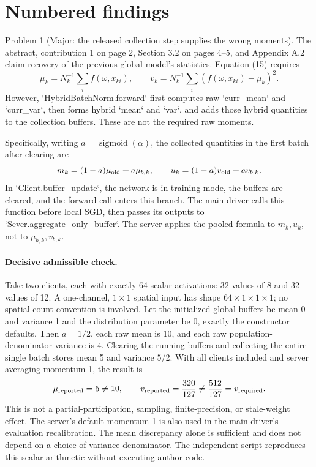 \documentclass[10pt]{article}
\begin{document}
\section*{Numbered findings}
Problem 1 (Major: the released collection step supplies the wrong moments).  The abstract, contribution 1 on page 2, Section 3.2 on pages 4–5, and Appendix A.2 claim recovery of the previous global model’s statistics. Equation (15) requires \[\mu_k=N_k^{-1}\sum_i f(\omega,x_{ki}),\qquad
 v_k=N_k^{-1}\sum_i(f(\omega,x_{ki})-\mu_k)^2 .\] However, `HybridBatchNorm.forward` first computes raw `curr\_mean` and `curr\_var`, then forms hybrid `mean` and `var`, and adds those hybrid quantities to the collection buffers. These are not the required raw moments.\par
Specifically, writing \(a=\operatorname{sigmoid}(\alpha)\), the collected quantities in the first batch after clearing are \[m_k=(1-a)\mu_{\rm old}+a\mu_{b,k},\qquad
 u_k=(1-a)v_{\rm old}+av_{b,k}.\] In `Client.buffer\_update`, the network is in training mode, the buffers are cleared, and the forward call enters this branch. The main driver calls this function before local SGD, then passes its outputs to `Sever.aggregate\_only\_buffer`. The server applies the pooled formula to \(m_k,u_k\), not to \(\mu_{b,k},v_{b,k}\).\par
\paragraph*{Decisive admissible check.}\mbox{}\par
Take two clients, each with exactly 64 scalar activations: 32 values of 8 and 32 values of 12. A one-channel, \(1\times1\) spatial input has shape \(64\times1\times1\times1\); no spatial-count convention is involved. Let the initialized global buffers be mean 0 and variance 1 and the distribution parameter be 0, exactly the constructor defaults. Then \(a=1/2\), each raw mean is 10, and each raw population-denominator variance is 4. Clearing the running buffers and collecting the entire single batch stores mean 5 and variance \(5/2\). With all clients included and server averaging momentum 1, the result is \[\mu_{\rm reported}=5\ne10,\qquad
 v_{\rm reported}=\frac{320}{127}
 \ne \frac{512}{127}=v_{\rm required}.\] This is not a partial-participation, sampling, finite-precision, or stale-weight effect. The server’s default momentum 1 is also used in the main driver’s evaluation recalibration. The mean discrepancy alone is sufficient and does not depend on a choice of variance denominator. The independent script reproduces this scalar arithmetic without executing author code.\par
\end{document}
